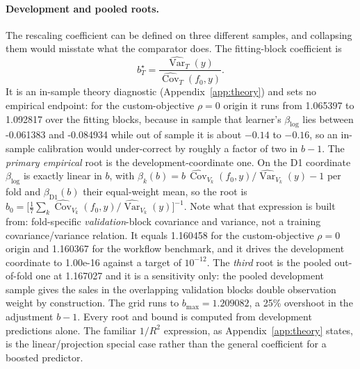 \documentclass[10pt]{article}
\theoremstyle{definition}
\newcommand{\Cov}{\operatorname{Cov}}
\newcommand{\Var}{\operatorname{Var}}
\newcommand{\1}{\mathbf{1}}
\begin{document}
\paragraph{Development and pooled roots.}
The rescaling coefficient can be defined on three different samples, and collapsing them
would misstate what the comparator does. The fitting-block coefficient is
\[
b^{\star}_{T}=\frac{\widehat{\Var}_T(y)}{\widehat{\Cov}_T(f_0,y)}.
\]
It is an in-sample theory diagnostic (Appendix~\ref{app:theory}) and sets no empirical endpoint: for the custom-objective $\rho=0$ origin
it runs from 1.065397 to 1.092817 over the fitting blocks, because in sample that learner's
$\beta_{\log}$ lies between -0.061383 and -0.084934 while out of sample it is about
$-0.14$ to $-0.16$, so an in-sample calibration would under-correct by roughly a factor of two in $b-1$. The
\emph{primary empirical} root is the development-coordinate one. On the D1 coordinate
$\beta_{\log}$ is exactly linear in $b$, with
$\beta_k(b)=b\,\widehat{\Cov}_{V_k}(f_0,y)/\widehat{\Var}_{V_k}(y)-1$ per fold and
$\beta_{\mathrm{D1}}(b)$ their equal-weight mean, so the root is
$b_{0}=\bigl[\tfrac{1}{7}\sum_{k}\widehat{\Cov}_{V_k}(f_0,y)/\widehat{\Var}_{V_k}(y)\bigr]^{-1}$. Note what
that expression is built from: fold-specific \emph{validation}-block covariance and variance, not a
training covariance/variance relation. It equals 1.160458 for the custom-objective $\rho=0$
origin and 1.160367 for the workflow benchmark, and it drives the development coordinate to
1.00e-16 against a target of $10^{-12}$. The \emph{third} root is the pooled out-of-fold one at
1.167027 and it is a sensitivity only: the pooled development sample gives the sales in the
overlapping validation blocks double observation weight by construction. The grid runs to $b_{\max}=1.209082$, a 25\% overshoot in the adjustment $b-1$.
Every root and bound is computed from development predictions alone. The familiar $1/R^{2}$ expression, as Appendix~\ref{app:theory} states, is the
linear/projection special case rather than the general coefficient for a boosted predictor.
\end{document}
